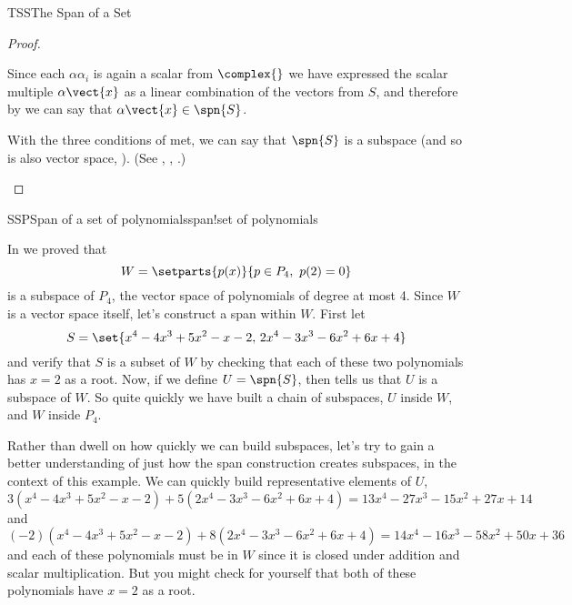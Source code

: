 \begin{subsect}{TSS}{The Span of a Set}
\begin{proof}
\begin{para}
%
Since each $\alpha\alpha_i$ is again a scalar from $\complex{\null}$ we have expressed the scalar multiple $\alpha\vect{x}$ as a linear combination of the vectors from $S$, and therefore by  we can say that $\alpha\vect{x}\in\spn{S}$.\end{para}
%
\begin{para}With the three conditions of  met, we can say that $\spn{S}$ is a subspace (and so is also vector space, ).
(See , , .)\end{para}
%
\end{proof}
%
\begin{example}{SSP}{Span of a set of polynomials}{span!set of polynomials}
\begin{para}In  we proved that
%
\begin{equation*}
W=\setparts{p(x)}{p\in P_4,\ p(2)=0}
\end{equation*}
%
is a subspace of $P_4$, the vector space of polynomials of degree at most 4.  Since $W$ is a vector space itself, let's construct a span within $W$.  First let
%
\begin{equation*}
S=\set{x^4-4x^3+5x^2-x-2,\,2x^4-3x^3-6x^2+6x+4}
\end{equation*}
%
and verify that $S$ is a subset of $W$ by checking that each of these two polynomials has $x=2$ as a root.  Now, if we define $U=\spn{S}$, then  tells us that $U$ is a subspace of $W$.  So quite quickly we have built a chain of subspaces, $U$ inside $W$, and $W$ inside $P_4$.\end{para}
%
\begin{para}Rather than dwell on how quickly we can build subspaces, let's try to gain a better understanding of just how the span construction creates subspaces, in the context of this example.  We can quickly build representative elements of $U$,
%
\begin{equation*}
3(x^4-4x^3+5x^2-x-2)+5(2x^4-3x^3-6x^2+6x+4)=13x^4-27x^3-15x^2+27x+14
\end{equation*}
%
and
%
\begin{equation*}
(-2)(x^4-4x^3+5x^2-x-2)+8(2x^4-3x^3-6x^2+6x+4)=14x^4-16x^3-58x^2+50x+36
\end{equation*}
%
and each of these polynomials must be in $W$ since it is closed under addition and scalar multiplication.  But you might check for yourself that both of these polynomials have $x=2$ as a root.\end{para}

\end{example}
\end{subsect}

